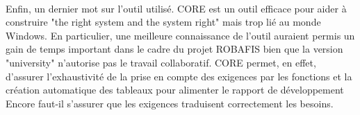 \paragraph{}
Enfin, un dernier mot sur l'outil utilisé. CORE est un outil efficace pour aider à construire "the right system and the system right" mais trop lié au monde Windows. En particulier, une meilleure connaissance de l'outil auraient permis un gain de temps important dans le cadre du projet ROBAFIS bien que la version "university" n'autorise pas le travail collaboratif. CORE permet, en effet, d'assurer l'exhaustivité de la prise en compte des exigences par les fonctions et la création automatique des tableaux pour alimenter le rapport de développement Encore faut-il s'assurer que les exigences traduisent correctement les besoins.